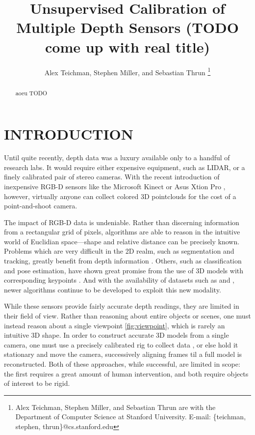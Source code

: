 \documentclass[letterpaper, 10 pt, conference]{ieeeconf}  %
\title{\LARGE \bf
Unsupervised Calibration of Multiple Depth Sensors (TODO come up with real title)}
\author{Alex Teichman, Stephen Miller, and Sebastian Thrun
\thanks{Alex Teichman, Stephen Miller, and Sebastian Thrun are with the Department of Computer Science at Stanford University. \newline E-mail: \{teichman, stephen, thrun\}@cs.stanford.edu } }
\begin{document}
\maketitle
\thispagestyle{empty}
\pagestyle{empty}


\begin{abstract}
aoeu
TODO
\end{abstract}


\section{INTRODUCTION}

Until quite recently, depth data was a luxury available only to a handful of research labs. It would require 
either expensive equipment, such as LIDAR, or a finely calibrated pair of stereo cameras. With the recent 
introduction of inexpensive RGB-D sensors like the Microsoft Kinect \cite{kinect} or Asus Xtion Pro \cite{xtion}, 
however, virtually anyone can collect colored 3D pointclouds for the cost of a point-and-shoot camera.

The impact of RGB-D data is undeniable. Rather than discerning information from a rectangular grid of pixels, algorithms 
are able to reason in the intuitive world of Euclidian space---shape and relative distance can be precisely known. 
Problems which are very difficult in the 2D realm, such as segmentation and tracking, greatly benefit from depth 
information \cite{rgbdtracking}.  Others, such as classification and pose estimation, have shown great promise 
from the use of 3D models with corresponding keypoints \cite{rgbdclassification}.
And with the availability of datasets such as \cite{rgbd-dataset} and \cite{nist-dataset}, newer algorithms continue to 
be developed to exploit this new modality.

While these sensors provide fairly accurate depth readings, they are limited in their field of view. Rather than reasoning 
about entire objects or scenes, one must instead reason about a single viewpoint \ref{fig:viewpoint}, which is rarely 
an intuitive 3D shape. In order to 
construct accurate 3D models from a single camera, one must use a precisely calibrated rig to collect 
data \cite{solutionsinperception}, or else hold it stationary and move the camera, successively aligning frames til a 
full model is reconstructed. Both of these approaches, while successful, are limited in scope: the first requires a 
great amount of human intervention, and both require objects of interest to be rigid.
\end{document}
